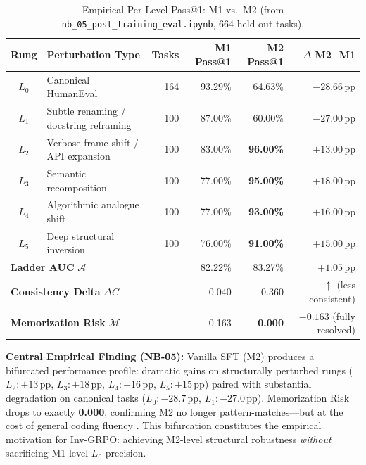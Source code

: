 \documentclass[12pt, a4paper]{article}
\begin{document}
\begin{table}[H]
\centering
\small
\caption{Empirical Per-Level Pass@1: M1 vs.\ M2 (from \texttt{nb\_05\_post\_training\_eval.ipynb}, 664 held-out tasks).}
\label{tab:m1_vs_m2}
\begin{tabularx}{\textwidth}{c l r r r r}
\toprule
\textbf{Rung} & \textbf{Perturbation Type} & \textbf{Tasks} & \textbf{M1 Pass@1} & \textbf{M2 Pass@1} & \textbf{$\Delta$ M2$-$M1} \\
\midrule
$L_0$ & Canonical HumanEval \cite{evoeval}     & 164 & 93.29\% & 64.63\% & \textcolor{AlertRed}{$-28.66$\,pp} \\
$L_1$ & Subtle renaming / docstring reframing   & 100 & 87.00\% & 60.00\% & \textcolor{AlertRed}{$-27.00$\,pp} \\
$L_2$ & Verbose frame shift / API expansion     & 100 & 83.00\% & \textbf{96.00\%} & \textcolor{SuccessGreen}{$+13.00$\,pp} \\
$L_3$ & Semantic recomposition                  & 100 & 77.00\% & \textbf{95.00\%} & \textcolor{SuccessGreen}{$+18.00$\,pp} \\
$L_4$ & Algorithmic analogue shift              & 100 & 77.00\% & \textbf{93.00\%} & \textcolor{SuccessGreen}{$+16.00$\,pp} \\
$L_5$ & Deep structural inversion               & 100 & 76.00\% & \textbf{91.00\%} & \textcolor{SuccessGreen}{$+15.00$\,pp} \\
\midrule
\multicolumn{3}{l}{\textbf{Ladder AUC} $\mathcal{A}$}         & 82.22\% & 83.27\% & \textcolor{SuccessGreen}{$+1.05$\,pp} \\
\multicolumn{3}{l}{\textbf{Consistency Delta} $\Delta C$}      & 0.040   & 0.360   & \textcolor{AlertRed}{$\uparrow$ (less consistent)} \\
\multicolumn{3}{l}{\textbf{Memorization Risk} $\mathcal{M}$}  & 0.163   & \textbf{0.000}   & \textcolor{SuccessGreen}{$-0.163$ (fully resolved)} \\
\bottomrule
\end{tabularx}
\end{table}

\begin{findingbox}
\textbf{Central Empirical Finding (NB-05):} Vanilla SFT (M2) produces a bifurcated performance profile: dramatic gains on structurally perturbed rungs ($L_2{:}+13$\,pp, $L_3{:}+18$\,pp, $L_4{:}+16$\,pp, $L_5{:}+15$\,pp) paired with substantial degradation on canonical tasks ($L_0{:}-28.7$\,pp, $L_1{:}-27.0$\,pp). Memorization Risk drops to exactly \textbf{0.000}, confirming M2 no longer pattern-matches---but at the cost of general coding fluency \cite{ibft_memorization, supercorrect}. This bifurcation constitutes the empirical motivation for Inv-GRPO: achieving M2-level structural robustness \emph{without} sacrificing M1-level $L_0$ precision.
\end{findingbox}
\end{document}
